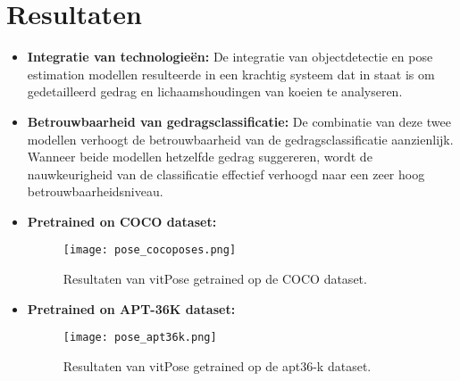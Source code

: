 \section{Resultaten}
\begin{itemize}
  \item \textbf{Integratie van technologieën:} De integratie van objectdetectie en pose estimation modellen resulteerde in een krachtig systeem dat in staat is om gedetailleerd gedrag en lichaamshoudingen van koeien te analyseren.
  \item \textbf{Betrouwbaarheid van gedragsclassificatie: } De combinatie van deze twee modellen verhoogt de betrouwbaarheid van de gedragsclassificatie aanzienlijk. Wanneer beide modellen hetzelfde gedrag suggereren, wordt de nauwkeurigheid van de classificatie effectief verhoogd naar een zeer hoog betrouwbaarheidsniveau.
  \newpage
  \item \textbf{Pretrained on COCO dataset:} 
  \newline 
  \begin{figure}[H]
    \centering
    \texttt{[image: pose\_cocoposes.png]}
    \caption{Resultaten van vitPose getrained op de COCO dataset.}
    \label{fig:cocopose}
  \end{figure}
  \item \textbf{Pretrained on APT-36K dataset:} 
  \newline
  \begin{figure}[H]
    \centering
    \texttt{[image: pose\_apt36k.png]}
    \caption{Resultaten van vitPose getrained op de apt36-k dataset.}
    \label{fig:apt36kpose}
  \end{figure}
\end{itemize}